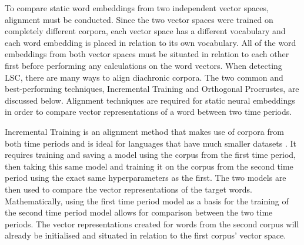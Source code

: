 To compare static word embeddings from two independent vector spaces, alignment must be conducted. Since the two vector spaces were trained on completely different corpora, each vector space has a different vocabulary and each word embedding is placed in relation to its own vocabulary. All of the word embeddings from both vector spaces must be situated in relation to each other first before performing any calculations on the word vectors. When detecting LSC, there are many ways to align diachronic corpora. The two common and best-performing techniques, Incremental Training and Orthogonal Procrustes, are discussed below. Alignment techniques are required for static neural embeddings in order to compare vector representations of a word between two time periods. 

Incremental Training is an alignment method that makes use of corpora from both time periods and is ideal for languages that have much smaller datasets \citep{kim-temporal2014}. It requires training and saving a model using the corpus from the first time period, then taking this same model and training it on the corpus from the second time period using the exact same hyperparameters as the first. The two models are then used to compare the vector representations of the target words. Mathematically, using the first time period model as a basis for the training of the second time period model allows for comparison between the two time periods. The vector representations created for words from the second corpus will already be initialised and situated in relation to the first corpus' vector space.

